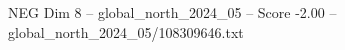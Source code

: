 \begin{textsample}{NEG Dim 8 – global\_north\_2024\_05 – Score -2.00 – global\_north\_2024\_05/108309646.txt}
\end{textsample}
